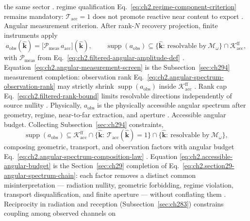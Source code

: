 the same sector \cite{stratton1941}. regime qualification Eq.~\eqref{eq:ch2.regime-component-criterion} remains
mandatory: \(\mathcal{T}_{\mathrm{acc}}=1\) does not promote reactive near content to export
\cite{harrington2001}.
Angular measurement criterion. After rank-$N$ recovery projection, finite instruments apply
\begin{equation}
\label{eq:ch2.angular-measurement-screen}
a_{\mathrm{obs}}(\widehat{\mathbf{k}})
=
\big[\mathcal{P}_{\mathrm{meas}}\,a_{\mathrm{acc}}\big](\widehat{\mathbf{k}}),
\qquad
\operatorname{supp}(a_{\mathrm{obs}})
\subseteq
\{\widehat{\mathbf{k}}:\ \text{resolvable by}\ \mathcal{M}_\omega\}
\cap
\mathcal{K}_{\mathrm{acc}}^{\mathrm{ff}},
\end{equation}
with \(\mathcal{P}_{\mathrm{meas}}\) from Eq.~\eqref{eq:ch2.filtered-angular-amplitude-def}
\cite{stratton1941}. Equation~\eqref{eq:ch2.angular-measurement-screen} is the
Subsection~\ref{sec:ch294} measurement completion: observation rank
Eq.~\eqref{eq:ch2.angular-spectrum-observation-rank} may strictly shrink
\(\operatorname{supp}(a_{\mathrm{obs}})\) inside \(\mathcal{K}_{\mathrm{acc}}^{\mathrm{ff}}\)
\cite{stratton1941}. Rank cap Eq.~\eqref{eq:ch2.filtered-rank-bound} limits resolvable directions
independently of source nullity \cite{harrington2001}. Physically, \(a_{\mathrm{obs}}\) is the
physically accessible angular spectrum after geometry, regime, near-to-far extraction, and
aperture \cite{stratton1941}.
Accessible angular budget. Collecting Subsection~\ref{sec:ch294} constraints,
\label{eq:ch2.accessible-modal-sector}
\begin{equation}
\label{eq:ch2.accessible-angular-budget}
\operatorname{supp}(a_{\mathrm{obs}})
\subseteq
\mathcal{K}_{\mathrm{acc}}^{\mathrm{ff}}
\cap
\{\widehat{\mathbf{k}}:\ \mathcal{T}_{\mathrm{acc}}(\widehat{\mathbf{k}})=1\}
\cap
\{\widehat{\mathbf{k}}:\ \text{resolvable by}\ \mathcal{M}_\omega\},
\end{equation}
composing geometric, transport, and observation factors with angular budget
Eq.~\eqref{eq:ch2.angular-spectrum-composition-law} \cite{stratton1941}. Equation
\eqref{eq:ch2.accessible-angular-budget} is the Section~\ref{sec:ch29} completion of
Eq.~\eqref{eq:ch2.section29-angular-spectrum-chain}: each factor removes a distinct common misinterpretation
--- radiation nullity, geometric forbidding, regime violation, transport disqualification, and
finite aperture --- without conflating them \cite{stratton1941}. Reciprocity in radiation and reception (Subsection~\ref{sec:ch283}) constrains coupling among observed channels on
